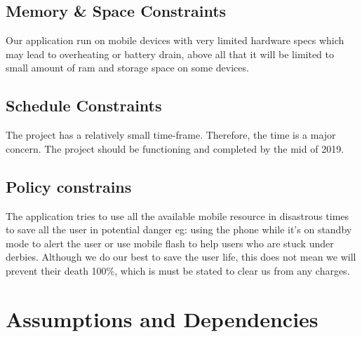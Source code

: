 \documentclass{scrreprt}
\begin{document}
\subsection{Memory \& Space Constraints}
Our application run on mobile devices with very limited hardware specs which may lead to overheating or battery drain, above all that it will be limited to small amount of ram and storage space on some devices. 

\subsection{Schedule Constraints}
The project has a relatively small time-frame. Therefore, the time is a major concern. The project should be functioning and completed by the mid of 2019.

\subsection{Policy constrains}
The application tries to use all the available mobile resource in disastrous times to save all the user in potential danger eg: using the phone while it's on standby mode to alert the user or use mobile flash to help users who are stuck under derbies. Although we do our best to save the user life, this does not mean we will prevent their death 100\%, which is must be stated to clear us from any charges.


\section{Assumptions and Dependencies}

\end{document}
